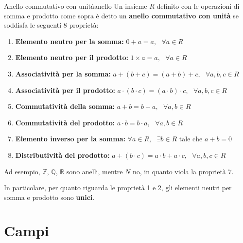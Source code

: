 \documentclass[12pt]{report}
\newcommand{\whitespace}{\text{ }}
\newcommand{\taleche}{\text{ tale che }}
\newcommand{\Z}{\mathbb{Z}}
\newcommand{\Q}{\mathbb{Q}}
\newcommand{\R}{\mathbb{R}}
\begin{document}
	\begin{definizione}{Anello commutativo con unità}{anello}
		Un insieme $R$ definito con le operazioni di somma e prodotto come sopra è detto un \textbf{anello commutativo con unità} se soddisfa le seguenti 8 proprietà:
		
		\begin{enumerate}
			
			\item \textbf{Elemento neutro per la somma:} $ 0 + a = a,\whitespace\forall a \in R $
			
			\item \textbf{Elemento neutro per il prodotto:} $ 1 \times a = a,\whitespace \forall a \in R $
			
			\item \textbf{Associatività per la somma:} $ a + (b + c) = (a + b) + c,\whitespace \forall a, b, c \in R $
			
			\item \textbf{Associatività per il prodotto:} $ a \cdot (b \cdot c) = (a \cdot b) \cdot c,\whitespace \forall a, b, c \in R $
			
			\item \textbf{Commutatività della somma:} $ a + b = b + a, \whitespace \forall a, b \in R $
			
			\item \textbf{Commutatività del prodotto:} $ a \cdot b = b \cdot a, \whitespace \forall a, b \in R $
			
			\item \textbf{Elemento inverso per la somma:} $ \forall a \in R, \whitespace \exists b \in R \taleche a + b = 0 $
			
			\item \textbf{Distributività del prodotto:} $ a + (b \cdot c) = a \cdot b + a \cdot c, \whitespace \forall a, b, c \in R $
			
		\end{enumerate}
	\end{definizione}
	
	Ad esempio, $\Z$, $\Q$, $\R$ sono anelli, mentre $N$ no, in quanto viola la proprietà 7.
	
	In particolare, per quanto riguarda le proprietà 1 e 2, gli elementi neutri per somma e prodotto sono \textbf{unici}.
	
	\section{Campi}
	
\end{document}
